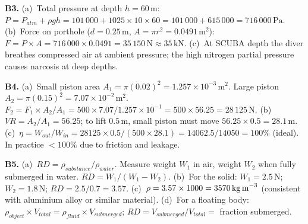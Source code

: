 \textbf{B3.}
(a)~Total pressure at depth $h=60\,\text{m}$:
$P=P_{atm}+\rho gh=101\,000+1025\times10\times60
=101\,000+615\,000=716\,000\,\text{Pa}$. \quad
(b)~Force on porthole ($d=0.25\,\text{m}$, $A=\pi r^2
=0.0491\,\text{m}^2$):
$F=P\times A=716\,000\times0.0491=35\,150\,\text{N}
\approx35\,\text{kN}$. \quad
(c)~At SCUBA depth the diver breathes compressed air at
ambient pressure; the high nitrogen partial pressure
causes narcosis at deep depths.

\textbf{B4.}
(a)~Small piston area $A_1=\pi(0.02)^2
=1.257\times10^{-3}\,\text{m}^2$.
Large piston $A_2=\pi(0.15)^2=7.07\times10^{-2}\,\text{m}^2$.
$F_2=F_1\times A_2/A_1=500\times7.07/1.257\times10^{-1}
=500\times56.25=28\,125\,\text{N}$. \quad
(b)~$VR=A_2/A_1=56.25$; to lift $0.5\,\text{m}$,
small piston must move $56.25\times0.5=28.1\,\text{m}$.
\quad
(c)~$\eta=W_{out}/W_{in}=28125\times0.5/(500\times28.1)
=14062.5/14050=100\%$ (ideal). In practice
$<100\%$ due to friction and leakage.

\textbf{B5.}
(a)~$RD=\rho_{substance}/\rho_{water}$. Measure weight
$W_1$ in air, weight $W_2$ when fully submerged in
water. $RD=W_1/(W_1-W_2)$. \quad
(b)~For the solid: $W_1=2.5\,\text{N}$;
$W_2=1.8\,\text{N}$; $RD=2.5/0.7=3.57$. \quad
(c)~$\rho=3.57\times1000=3570\,\text{kg\,m}^{-3}$
(consistent with aluminium alloy or similar material). \quad
(d)~For a floating body: $\rho_{object}\times V_{total}
=\rho_{fluid}\times V_{submerged}$;
$RD=V_{submerged}/V_{total}=$ fraction submerged.

\endgroup


